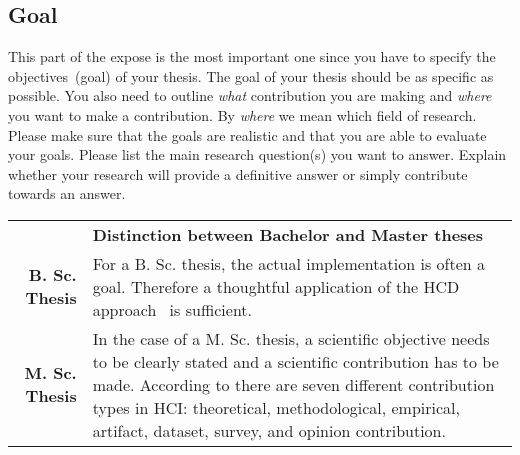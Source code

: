 \subsection{Goal}
\label{subsec:goal}
This part of the expose is the most important one since you have to specify the objectives~(goal) of your thesis. The goal of your thesis should be as specific as possible. You also need to outline \emph{what} contribution you are making and \emph{where} you want to make a contribution. By \emph{where} we mean which field of research. Please make sure that the goals are realistic and that you are able to evaluate your goals. Please list the main research question(s) you want to answer. Explain whether your research will provide a
definitive answer or simply contribute towards an answer.

\begin{table}[htb]
\small
\colorbox{bamacolor}{
\centering
\begin{tabularx}{\textwidth}{@{} r Y @{}}
	&
	\textbf{Distinction between Bachelor and Master theses}\vspace{2mm}\\
    \textbf{B. Sc. Thesis} &
    For a B. Sc. thesis, the actual implementation is often a goal. Therefore a thoughtful application of the HCD approach~\cite{gulliksenKeyPrinciplesUsercentred2003, dis20109241} is sufficient. \vspace{2mm}\\
	\textbf{M. Sc. Thesis} &
	In the case of a M. Sc. thesis, a scientific objective needs to be clearly stated and a scientific contribution has to be made. According to \cite{contributionTypes2016} there are seven different contribution types in HCI: theoretical, methodological, empirical, artifact, dataset, survey, and opinion contribution.\vspace{2mm}\\
\end{tabularx}
}
\end{table}

